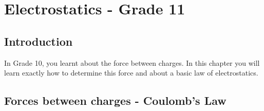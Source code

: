 



\chapter{Electrostatics - Grade 11}
\label{p:em:es11}

\section{Introduction}
In Grade 10, you learnt about the force between charges. In this
chapter you will learn exactly how to determine this force and
about a basic law of electrostatics.



\section{Forces between charges - Coulomb's Law}

